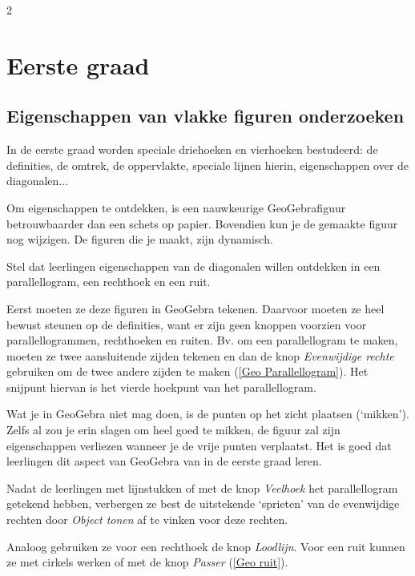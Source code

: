 \begin{multicols}{2}
 
 \section{Eerste graad}

\subsection{Eigenschappen van vlakke figuren onderzoeken}

In de eerste graad worden speciale driehoeken en vierhoeken bestudeerd: de definities, de omtrek, de oppervlakte, speciale lijnen hierin, eigenschappen over de diagonalen... 

Om eigenschappen te ontdekken, is een nauwkeurige GeoGebrafiguur betrouwbaarder dan een schets op papier. Bovendien kun je de gemaakte figuur nog wijzigen. De figuren die je maakt, zijn dynamisch.

Stel dat leerlingen eigenschappen van de diagonalen willen ontdekken in een parallellogram, een rechthoek en een ruit. 

Eerst moeten ze deze figuren in GeoGebra tekenen. Daarvoor moeten ze heel bewust steunen op de definities, want er zijn geen knoppen voorzien voor parallellogrammen, rechthoeken en ruiten. Bv. om een parallellogram te maken, moeten ze twee aansluitende zijden tekenen en dan de knop \emph{Evenwijdige rechte} gebruiken om de twee andere zijden te maken (\autoref{Geo Parallellogram}). Het snijpunt hiervan is het vierde hoekpunt van het parallellogram.

Wat je in GeoGebra niet mag doen, is de punten op het zicht plaatsen (`mikken'). Zelfs al zou je erin slagen om heel goed te mikken, de figuur zal zijn eigenschappen verliezen wanneer je de vrije punten verplaatst. Het is goed dat leerlingen dit aspect van GeoGebra van in de eerste graad leren.


Nadat de leerlingen met lijnstukken of met de knop \emph{Veelhoek} het parallellogram getekend hebben, verbergen ze best de uitstekende `sprieten' van de evenwijdige rechten door \emph{Object tonen} af te vinken voor deze rechten.

Analoog gebruiken ze voor een rechthoek de knop \emph{Loodlijn}. Voor een ruit kunnen ze met cirkels werken of met de knop \emph{Passer} (\autoref{Geo ruit}). 



\end{multicols}
